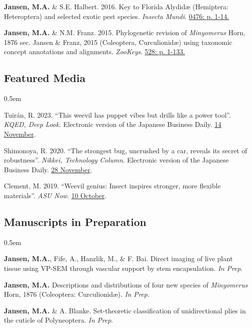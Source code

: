 \documentclass[12pt,a4paper]{article}
\begin{document}
\begin{description}
		\item \textbf{Jansen, M.A.} \& S.E. Halbert. 2016. Key to Florida Alydid{\ae} (Hemiptera: Heteroptera) and selected exotic pest species. \textit{Insecta Mundi}. \href{http://journals.fcla.edu/mundi/article/view/87952/84644}{0476: p. 1-14.}
		
		\item \textbf{Jansen, M.A.} \& N.M. Franz. 2015. Phylogenetic revision of \textit{Minyomerus} Horn, 1876 sec. Jansen \& Franz, 2015 (Coleoptera, Curculionid\ae) using taxonomic concept annotations and alignments. \textit{ZooKeys}. \href{http://zookeys.pensoft.net/articles.php?id=6001}{528: p. 1-133.}
	\end{description}
	
	\subsection*{Featured Media}
	\begin{description}
		\itemsep0.5em
		\item Tuir\'{a}n, R. 2023. ``This weevil has puppet vibes but drills like a power tool''. \textit{KQED, Deep Look}. Electronic version of the Japanese Business Daily. \href{https://www.kqed.org/science/1985068/this-weevil-has-puppet-vibes-but-drills-like-a-power-tool}{14 November}.
		\item Shimonoya, R. 2020. ``The strongest bug, uncrushed by a car, reveals its secret of robustness''. \textit{Nikkei, Technology Column}. Electronic version of the Japanese Business Daily. \href{https://www.nikkei.com/article/DGXMZO66746060X21C20A1MY1000/}{28 November}.
		\item Clement, M. 2019. ``Weevil genius: Insect inspires stronger, more flexible materials''. \textit{ASU Now}. \href{https://asunow.asu.edu/20191010-discoveries-asu-engineering-weevil-inspires-stronger-flexible-materials}{10 October}.
		
	\end{description}

	\subsection*{Manuscripts in Preparation}
		\begin{description}
			\itemsep0.5em
			\item \textbf{Jansen, M.A.}, Fife, A., Hanzlik, M., \& F. Bai. Direct imaging of live plant tissue using VP-SEM through vascular support by stem encapsulation. \textit{In Prep}.
			\item \textbf{Jansen, M.A.} Descriptions and distributions of four new species of \textit{Minyomerus} Horn, 1876 (Coleoptera: Curculionid\ae). \textit{In Prep}.
			\item \textbf{Jansen, M.A.} \& A. Blanke. Set-theoretic classification of unidirectional plies in the cuticle of Polyneoptera. \textit{In Prep}.
		\end{description}
	
\end{document}
